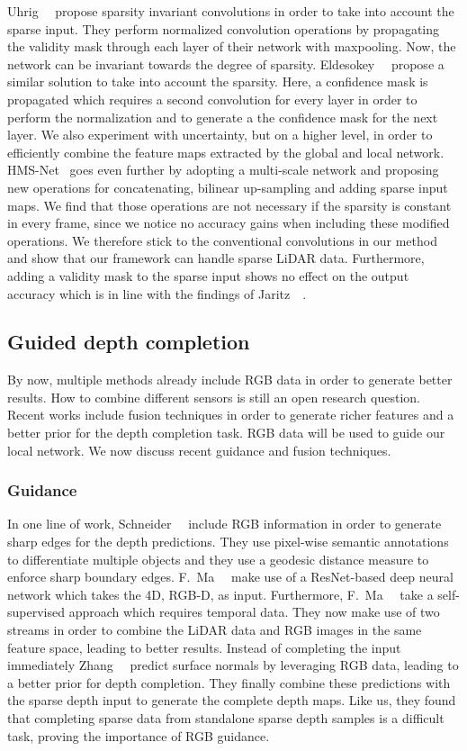 \documentclass{main_style}
\begin{document}
Uhrig~\etal~\cite{sparsity} propose sparsity invariant convolutions in order to take into account the sparse input. They perform normalized convolution operations by propagating the validity mask through each layer of their network with maxpooling. Now, the network can be invariant towards the degree of sparsity. Eldesokey~\etal~\cite{eld1} propose a similar solution to take into account the sparsity. Here, a confidence mask is propagated which requires a second convolution for every layer in order to perform the normalization and to generate a the confidence mask for the next layer. We also experiment with uncertainty, but on a higher level, in order to efficiently combine the feature maps extracted by the global and local network. HMS-Net~\cite{hms} goes even further by adopting a multi-scale network and proposing new operations for concatenating, bilinear up-sampling and adding sparse input maps. We find that those operations are not necessary if the sparsity is constant in every frame, since we notice no accuracy gains when including these modified operations. We therefore stick to the conventional convolutions in our method and show that our framework can handle sparse LiDAR data. Furthermore, adding a validity mask to the sparse input shows no effect on the output accuracy which is in line with the findings of Jaritz~\etal~\cite{jaritz}.

\subsection{Guided depth completion}
By now, multiple methods already include RGB data in order to generate better results. How to combine different sensors is still an open research question. Recent works include fusion techniques in order to generate richer features and a better prior for the depth completion task. RGB data will be used to guide our local network. We now discuss recent guidance and fusion techniques.

\subsubsection{Guidance}
In one line of work, Schneider~\etal~\cite{schneider} include RGB information in order to generate sharp edges for the depth predictions. They use pixel-wise semantic annotations to differentiate multiple objects and they use a geodesic distance measure to enforce sharp boundary edges. F.~Ma~\etal~\cite{sparsetodense, self_sup} make use of a ResNet-based deep neural network which takes the 4D, RGB-D, as input. Furthermore, F.~Ma~\etal~\cite{self_sup} take a self-supervised approach which requires temporal data. They now make use of two streams in order to combine the LiDAR data and RGB images in the same feature space, leading to better results. Instead of completing the input immediately Zhang~\etal~\cite{zhang} predict surface normals by leveraging RGB data, leading to a better prior for depth completion. They finally combine these predictions with the sparse depth input to generate the complete depth maps. Like us, they found that completing sparse data from standalone sparse depth samples is a difficult task, proving the importance of RGB guidance.
\newline
\end{document}
